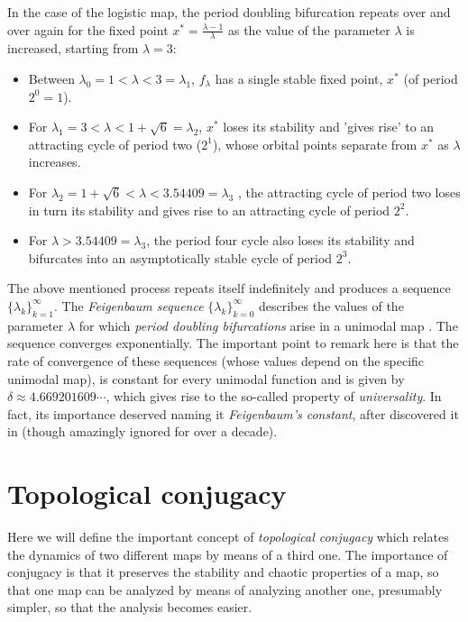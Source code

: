 \documentclass[10pt,twoside,titlepage]{book}
\numberwithin{equation}{chapter}
\numberwithin{figure}{chapter}
\numberwithin{table}{chapter}
\theoremstyle{plain}%
\theoremstyle{definition}
\theoremstyle{remark}
\begin{document}
In the case of the logistic map, the period doubling bifurcation repeats over and over again for the fixed point $x^{*}=\frac{\lambda-1}{\lambda}$ as the value of the parameter $\lambda$ is increased, starting from $\lambda=3$:
\begin{itemize}
	\item Between $\lambda_{0}=1<\lambda<3=\lambda_{1}$, $f_{\lambda}$ has a single stable fixed point, $x^{*}$ (of period $2^{0}=1$).
	\item For $\lambda_{1}=3<\lambda<1+\sqrt{6}=\lambda_{2}$, $x^{*}$ loses its stability and 'gives rise' to an attracting cycle of period two ($2^{1}$), whose orbital points separate from $x^{*}$ as
	$\lambda$ increases.
	\item For $\lambda_{2}=1+\sqrt{6}<\lambda<3.54409=\lambda_{3}$ \cite{Elaydi}, the attracting cycle of period two loses in turn its stability and gives rise to an attracting cycle of period $2^{2}$.
	\item For $\lambda>3.54409=\lambda_{3}$, the period four cycle also loses its stability and bifurcates into an asymptotically stable cycle of period $2^{3}$.
\end{itemize}

The above mentioned process repeats itself indefinitely and produces a sequence $\{\lambda_{k}\}_{k=1}^{\infty}$. The \emph{Feigenbaum sequence} $\{\lambda_{k}\}_{k=0}^{\infty}$ describes the values of the parameter $\lambda$ for which \emph{period doubling bifurcations} arise in a unimodal map \cite{Feigenbaum}. The sequence converges exponentially. The important point to remark here is that the rate of convergence of these sequences (whose values depend on the specific unimodal map), is constant for every unimodal function and is given by $\delta\approx4.669201609\cdots$, which gives rise to the so-called property of \emph{universality}. In fact, its importance deserved naming it \emph{Feigenbaum's constant}, after \cite{Feigenbaum} discovered it in \cite{Feigenbaum} (though amazingly ignored for over a decade).

\section{Topological conjugacy}
\label{sec:Conjugacy}

Here we will define the important concept of \emph{topological conjugacy} which relates the dynamics of two different maps by means of a third one. The importance of conjugacy is that it preserves the stability and chaotic properties of a map, so that one map can be analyzed by means of analyzing another one, presumably simpler, so that the analysis becomes easier.
\end{document}
